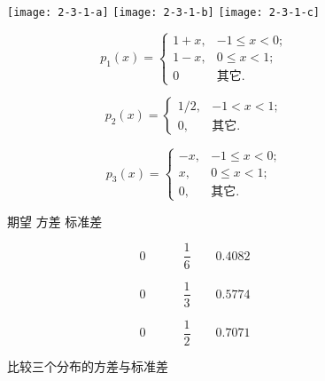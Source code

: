 \begin{figure}[h!]
	\begin{minipage}{0.3\textwidth}
		\texttt{[image: 2-3-1-a]}
		\texttt{[image: 2-3-1-b]}
		\texttt{[image: 2-3-1-c]}
	\end{minipage}
	\begin{minipage}{0.3\textwidth}
		
		\[
		p_{1}(x)=\left\{\begin{array}{ll}
		{1+x,} & {-1 \leqslant x<0 ;} \\ 
		{1-x,} & {0 \leqslant x<1 ;} \\ 
		{0}    & {\text{其它.}}
		\end{array}\right.
		\]
		
		\[
		p_{2}(x)=\left\{\begin{array}{ll}
		{1 / 2,} & {-1<x<1 ;} \\ 
		{0,}     & {\text{其它.}}
		\end{array}\right.
		\]
		
		\[
		p_{3}(x)=\left\{\begin{array}{ll}
		{-x,} & {-1 \leqslant x<0 ;} \\ 
		{x,}  & {0 \leqslant x<1 ;}   \\ 
		{0,}  & {\text{其它.}}
		\end{array}\right.
		\]
		
	\end{minipage}\qquad \quad
	\begin{minipage}{0.3\textwidth}
		
		\vspace{-5ex}
		\begin{center}
			期望 \quad 方差 \quad 标准差
		\end{center}
		
		\vspace*{-2ex}
		
		\[
		{0 \qquad \quad \frac{1}{6} \qquad 0.4082}
		\]
		
		\vspace{3ex}
		
		\[
		{0 \qquad \quad \frac{1}{3} \qquad 0.5774}
		\]
		
		
		\vspace{3ex} 
		
		\[
		{0 \qquad \quad \frac{1}{2} \qquad 0.7071} 
		\]
		
		
	\end{minipage}
	\caption{比较三个分布的方差与标准差}
	\label{fig:2-3-1}
\end{figure}


